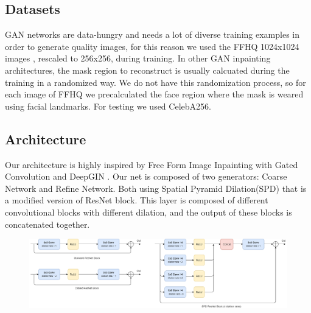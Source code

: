 \documentclass[10pt,twocolumn,letterpaper]{article}
\begin{document}
	\subsection{Datasets}
	GAN networks are data-hungry and needs a lot of diverse training examples in
	order to generate quality images, for this reason we used the FFHQ 1024x1024
	images \cite{karras2019style}, rescaled to 256x256, during training.  In other GAN inpainting
	architectures, the mask region to reconstruct is usually calcuated during the
	training in a randomized way.  We do not have this randomization process, so for
	each image of FFHQ we precalculated the face region where the mask is weared
	using facial landmarks.  For testing we used CelebA256.
	
	\subsection{Architecture}
	Our architecture is highly inspired by Free Form Image Inpainting with Gated Convolution \cite{yu2019free} and DeepGIN \cite{li2020deepgin}.
	Our net is composed of two generators: Coarse Network and Refine Network.
	Both using Spatial Pyramid Dilation(SPD) that is a modified version of ResNet block. This layer is composed of different convolutional blocks with different dilation, and the output of these blocks is concatenated together.
	\begin{figure}[t]
		\includegraphics[width=1\linewidth]{img/ResNetSPD.png}
		\label{fig:long}
		\label{fig:onecol}
	\end{figure}
\end{document}
